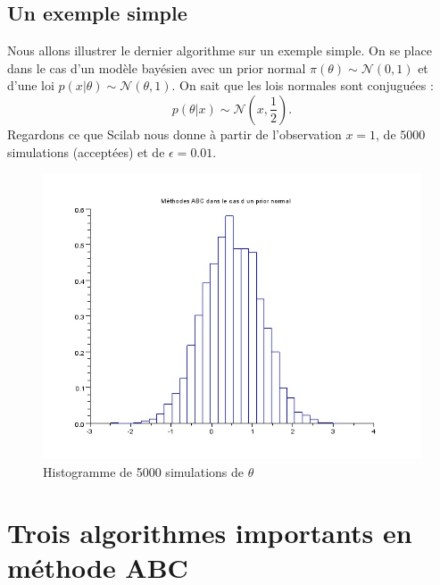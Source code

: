 \documentclass{article}
\theoremstyle{definition}
\begin{document}
\subsection{Un exemple simple}

Nous allons illustrer le dernier algorithme sur un exemple simple. On se place dans le cas d'un modèle bayésien avec un prior normal $\pi(\theta)\sim \mathcal N(0,1)$ et d'une loi $p(x|\theta)\sim\mathcal N(\theta,1)$. On sait que les lois normales sont conjuguées :
\[p(\theta|x)\sim\mathcal N (x,\frac{1}{2}).\]
Regardons ce que Scilab nous donne à partir de l'observation $x=1$, de $5000$ simulations (acceptées) et de $\epsilon=0.01$.

\begin{figure}[h]\centering
\includegraphics[scale=0.6]{ABCnorm.jpg}
\caption{Histogramme de 5000 simulations de $\theta$}
\label{fig:ABCnorm}
\end{figure}

\section{Trois algorithmes importants en méthode ABC}
\end{document}
